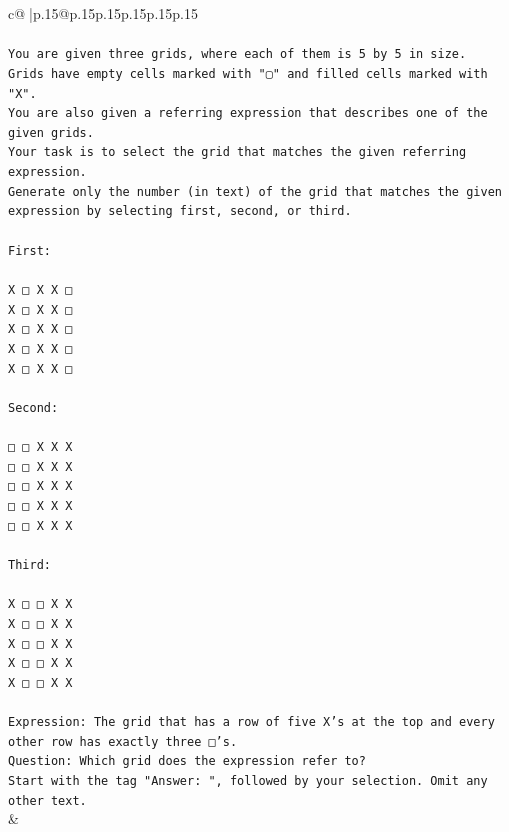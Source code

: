 \documentclass{article}
\begin{document}
{\begin{supertabular}{c@{$\;$}|p{.15\linewidth}@{}p{.15\linewidth}p{.15\linewidth}p{.15\linewidth}p{.15\linewidth}p{.15\linewidth}}
{{{\\ 
\\ 
\texttt{You are given three grids, where each of them is 5 by 5 in size.} \\
\texttt{Grids have empty cells marked with "▢" and filled cells marked with "X".} \\
\texttt{You are also given a referring expression that describes one of the given grids.} \\
\texttt{Your task is to select the grid that matches the given referring expression.} \\
\texttt{Generate only the number (in text) of the grid that matches the given expression by selecting first, second, or third.} \\
\\ 
\texttt{First:} \\
\\ 
\texttt{X □ X X □} \\
\texttt{X □ X X □} \\
\texttt{X □ X X □} \\
\texttt{X □ X X □} \\
\texttt{X □ X X □} \\
\\ 
\texttt{Second:} \\
\\ 
\texttt{□ □ X X X} \\
\texttt{□ □ X X X} \\
\texttt{□ □ X X X} \\
\texttt{□ □ X X X} \\
\texttt{□ □ X X X} \\
\\ 
\texttt{Third:} \\
\\ 
\texttt{X □ □ X X} \\
\texttt{X □ □ X X} \\
\texttt{X □ □ X X} \\
\texttt{X □ □ X X} \\
\texttt{X □ □ X X} \\
\\ 
\texttt{Expression: The grid that has a row of five X's at the top and every other row has exactly three □'s.} \\
\texttt{Question: Which grid does the expression refer to?} \\
\texttt{Start with the tag "Answer: ", followed by your selection. Omit any other text.} \\
            }
        }
    }
    & \\ \\


\end{supertabular}}
\end{document}
